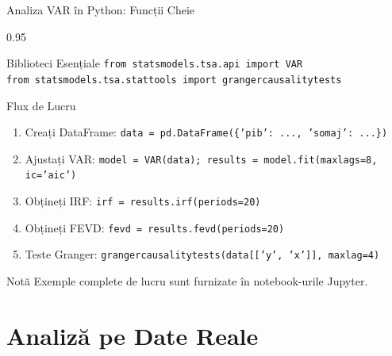 \documentclass[9pt, aspectratio=169, t]{beamer}
\begin{document}
\begin{frame}{Analiza VAR în Python: Funcții Cheie}
    \begin{cminipage}{0.95\textwidth}
    {\footnotesize
    \begin{block}{Biblioteci Esențiale}
        \texttt{from statsmodels.tsa.api import VAR} \\
        \texttt{from statsmodels.tsa.stattools import grangercausalitytests}
    \end{block}

    \begin{block}{Flux de Lucru}
        \begin{enumerate}\setlength{\itemsep}{0pt}
            \item Creați DataFrame: \texttt{data = pd.DataFrame(\{'pib': ..., 'somaj': ...\})}
            \item Ajustați VAR: \texttt{model = VAR(data); results = model.fit(maxlags=8, ic='aic')}
            \item Obțineți IRF: \texttt{irf = results.irf(periods=20)}
            \item Obțineți FEVD: \texttt{fevd = results.fevd(periods=20)}
            \item Teste Granger: \texttt{grangercausalitytests(data[['y', 'x']], maxlag=4)}
        \end{enumerate}
    \end{block}

    \begin{alertblock}{Notă}
        Exemple complete de lucru sunt furnizate în notebook-urile Jupyter.
    \end{alertblock}
    }
    \end{cminipage}
\end{frame}

\section{Analiză pe Date Reale}
\end{document}
